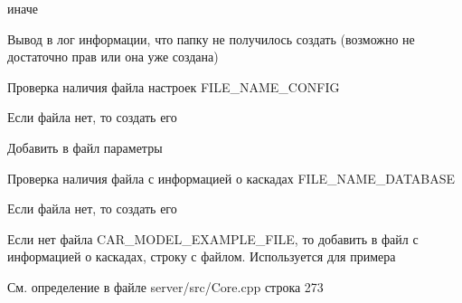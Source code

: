 иначе \begin{DoxyVerb}Вывод в лог информации, что папку не получилось создать (возможно не достаточно прав или она уже создана)
\end{DoxyVerb}


Проверка наличия файла настроек F\+I\+L\+E\+\_\+\+N\+A\+M\+E\+\_\+\+C\+O\+N\+F\+IG

Если файла нет, то создать его \begin{DoxyVerb}Добавить в файл параметры
\end{DoxyVerb}


Проверка наличия файла с информацией о каскадах F\+I\+L\+E\+\_\+\+N\+A\+M\+E\+\_\+\+D\+A\+T\+A\+B\+A\+SE

Если файла нет, то создать его

Если нет файла C\+A\+R\+\_\+\+M\+O\+D\+E\+L\+\_\+\+E\+X\+A\+M\+P\+L\+E\+\_\+\+F\+I\+LE, то добавить в файл с информацией о каскадах, строку с файлом. Используется для примера 

См. определение в файле server/src/\+Core.\+cpp строка 273

